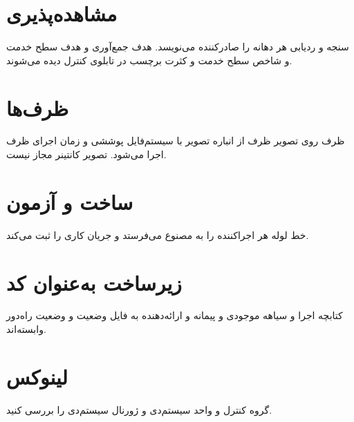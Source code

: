 \documentclass[a4paper,12pt]{article}
\begin{document}
\section*{مشاهده‌پذیری}
سنجه و ردیابی هر دهانه را صادرکننده می‌نویسد.
هدف جمع‌آوری و هدف سطح خدمت و شاخص سطح خدمت و کثرت برچسب
در تابلوی کنترل دیده می‌شوند.

\section*{ظرف‌ها}
ظرف روی تصویر ظرف از انباره تصویر با سیستم‌فایل پوششی و
زمان اجرای ظرف اجرا می‌شود. تصویر کانتینر مجاز نیست.

\section*{ساخت و آزمون}
خط لوله هر اجراکننده را به مصنوع می‌فرستد و جریان کاری را
ثبت می‌کند.

\section*{زیرساخت به‌عنوان کد}
کتابچه اجرا و سیاهه موجودی و پیمانه و ارائه‌دهنده به
فایل وضعیت و وضعیت راه‌دور وابسته‌اند.

\section*{لینوکس}
گروه کنترل و واحد سیستم‌دی و ژورنال سیستم‌دی را بررسی کنید.
\end{document}
